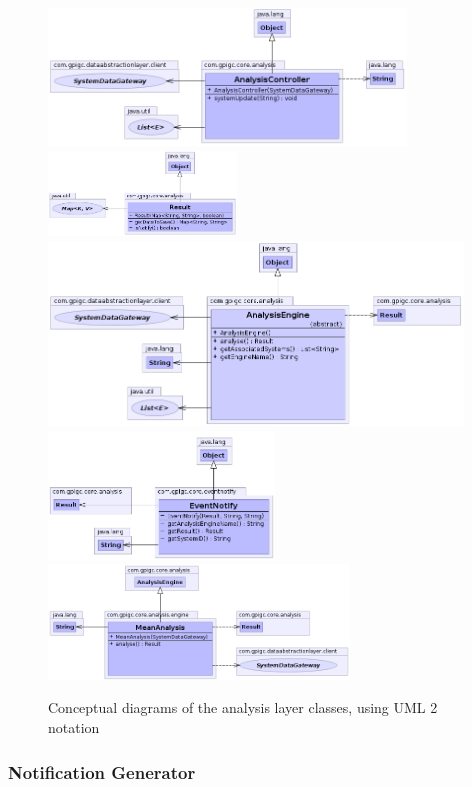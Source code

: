 \documentclass[10pt,a4paper]{article}
\begin{document}
\begin{figure}[ht!]
\centering
\includegraphics[width= 9.5cm]{images/Analysis/AnalysisController.png}
\includegraphics[width= 5cm]{images/Analysis/Result.png}
\includegraphics[width= 11cm]{images/Analysis/AnalysisEngine.png}
\includegraphics[width= 6cm]{images/Analysis/EventNotify.png}
\includegraphics[width= 8cm]{images/Analysis/MeanAnalysis.png}
\caption{Conceptual diagrams of the analysis layer classes, using UML 2 notation}
\label{fig:dataAbstractionPackage}
\end{figure}

\subsubsection{Notification Generator}
\end{document}
